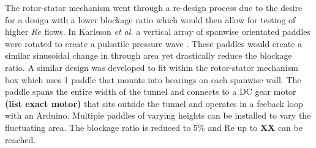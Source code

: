 The rotor-stator mechanism went through a re-design process due to the desire for a design with a lower blockage ratio which would then allow for testing of higher $Re$ flows.
In Karlsson \textit{et al.} a vertical array of spanwise orientated paddles were rotated to create a pulsatile pressure wave \cite{Karlsson1958}.
These paddles would create a similar sinusoidal change in through area yet drastically reduce the blockage ratio.
A similar design was developed to fit within the rotor-stator mechanism box which uses 1 paddle that mounts into bearings on each spanwise wall.
The paddle spans the entire width of the tunnel and connects to a DC gear motor {\bf (list exact motor)} that sits outside the tunnel and operates in a feeback loop with an Arduino.
Multiple paddles of varying heights can be installed to vary the fluctuating area.
The blockage ratio is reduced to 5\% and Re up to {\bf XX} can be reached.


